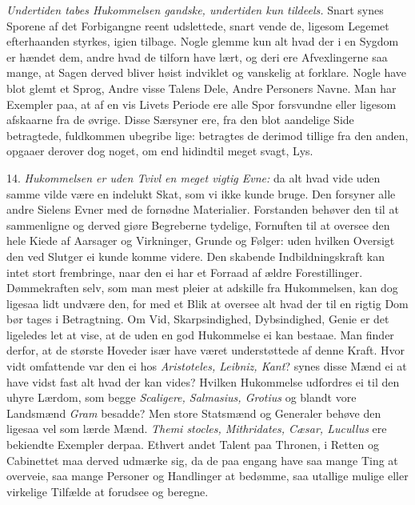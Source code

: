 \documentclass[12pt,a4paper]{article}
\newcommand{\opage}[1]{\marginnote{\footnotesize\textit{[#1]}}}
\begin{document}
\emph{Undertiden tabes Hukommelsen gandske, undertiden kun tildeels.} Snart synes Sporene
af det Forbigangne reent udslettede, snart vende de, ligesom Legemet efterhaanden
styrkes, igien tilbage. Nogle glemme kun alt hvad der i en Sygdom er hændet dem, andre
hvad de tilforn have lært, og deri ere Afvexlingerne saa mange, at Sagen derved bliver
høist indviklet og vanskelig at forklare. Nogle have blot glemt et Sprog, Andre visse
Talens Dele, Andre Personers Navne. Man har Exempler paa, at af en vis Livets Periode ere
alle Spor forsvundne eller ligesom afskaarne fra de øvrige. Disse Særsyner ere, fra den
blot aandelige Side betragtede, fuldkommen ubegribe%
\opage{120}lige: betragtes de derimod tillige fra den anden, opgaaer derover dog noget, om end
hidindtil meget svagt, Lys.

14. \emph{Hukommelsen er uden Tvivl en meget vigtig Evne:} da alt hvad vide uden samme
vilde være en indelukt Skat, som vi ikke kunde bruge. Den forsyner alle andre Sielens
Evner med de fornødne Materialier. Forstanden behøver den til at sammenligne og derved
giøre Begreberne tydelige, Fornuften til at oversee den hele Kiede af Aarsager og
Virkninger, Grunde og Følger: uden hvilken Oversigt den ved Slutger ei kunde komme
videre. Den skabende Indbildningskraft kan intet stort frembringe, naar den ei har et
Forraad af ældre Forestillinger. Dømmekraften selv, som man mest pleier at adskille fra
Hukommelsen, kan dog ligesaa lidt undvære den, for med et Blik at oversee alt hvad der
til en rigtig Dom bør tages i Betragtning. Om Vid, Skarpsindighed, Dybsindighed, Genie er
det ligeledes let at vise, at de uden en god Hukommelse ei kan bestaae. Man finder derfor,
at de største Hoveder især have været understøttede af denne Kraft. Hvor vidt omfattende
var den ei hos \emph{Aristoteles, Leibniz, Kant}? synes disse Mænd ei at have vidst fast
alt hvad der kan vides? Hvilken Hukommelse udfordres ei til den uhyre Lærdom, som begge
\emph{Scaligere, Salmasius, Grotius} og blandt vore Landsmænd \emph{Gram} besadde? Men
store Statsmænd og Generaler behøve den ligesaa vel som lærde Mænd. \emph{Themi%
\opage{121}stocles, Mithridates, Cæsar, Lucullus} ere bekiendte Exempler derpaa. Ethvert andet
Talent paa Thronen, i Retten og Cabinettet maa derved udmærke sig, da de paa engang have
saa mange Ting at overveie, saa mange Personer og Handlinger at bedømme, saa utallige
mulige eller virkelige Tilfælde at forudsee og beregne.
\end{document}
